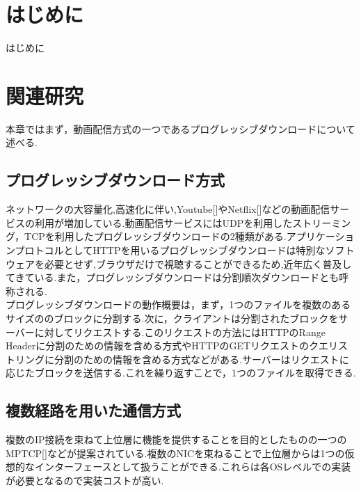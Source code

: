 \documentclass[a4j,12pt]{gradthesis_utf8}
\begin{document}
 
\maketitle %

\chapter{はじめに}\label{sec:sec1}
はじめに
\chapter{関連研究}\label{sec:sec2}
本章ではまず，動画配信方式の一つであるプログレッシブダウンロードについて述べる.

\section{プログレッシブダウンロード方式}
ネットワークの大容量化,高速化に伴い,Youtube[]やNetflix[]などの動画配信サービスの利用が増加している.動画配信サービスにはUDPを利用したストリーミング，TCPを利用したプログレッシブダウンロードの2種類がある.アプリケーションプロトコルとしてHTTPを用いるプログレッシブダウンロードは特別なソフトウェアを必要とせず,ブラウザだけで視聴することができるため,近年広く普及してきている.また，プログレッシブダウンロードは分割順次ダウンロードとも呼称される.\\
プログレッシブダウンロードの動作概要は，まず，1つのファイルを複数のあるサイズののブロックに分割する.次に，クライアントは分割されたブロックをサーバーに対してリクエストする.このリクエストの方法にはHTTPのRange Headerに分割のための情報を含める方式やHTTPのGETリクエストのクエリストリングに分割のための情報を含める方式などがある.サーバーはリクエストに応じたブロックを送信する.これを繰り返すことで，1つのファイルを取得できる.

 \section{複数経路を用いた通信方式}
 複数のIP接続を束ねて上位層に機能を提供することを目的としたものの一つのMPTCP[]などが提案されている.複数のNICを束ねることで上位層からは1つの仮想的なインターフェースとして扱うことができる.これらは各OSレベルでの実装が必要となるので実装コストが高い.
 
\end{document}
